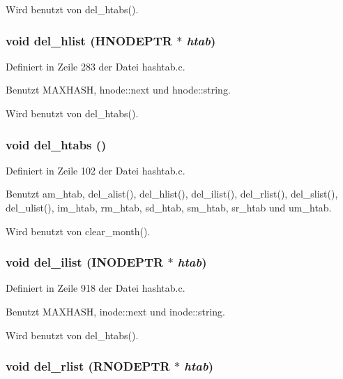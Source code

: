 Wird benutzt von del\_\-htabs().
\subsubsection{\setlength{\rightskip}{0pt plus 5cm}void del\_\-hlist ({\bf HNODEPTR} $\ast$ {\em htab})}\label{hashtab_8c_306d5a1540d43fa136c10272cb2f0a4a}




Definiert in Zeile 283 der Datei hashtab.c.

Benutzt MAXHASH, hnode::next und hnode::string.

Wird benutzt von del\_\-htabs().
\subsubsection{\setlength{\rightskip}{0pt plus 5cm}void del\_\-htabs ()}\label{hashtab_8c_f9fcdad76e91434fe5f0728f3a79ae74}




Definiert in Zeile 102 der Datei hashtab.c.

Benutzt am\_\-htab, del\_\-alist(), del\_\-hlist(), del\_\-ilist(), del\_\-rlist(), del\_\-slist(), del\_\-ulist(), im\_\-htab, rm\_\-htab, sd\_\-htab, sm\_\-htab, sr\_\-htab und um\_\-htab.

Wird benutzt von clear\_\-month().
\subsubsection{\setlength{\rightskip}{0pt plus 5cm}void del\_\-ilist ({\bf INODEPTR} $\ast$ {\em htab})}\label{hashtab_8c_d859897805bb7fc6479703fd3bcf493a}




Definiert in Zeile 918 der Datei hashtab.c.

Benutzt MAXHASH, inode::next und inode::string.

Wird benutzt von del\_\-htabs().
\subsubsection{\setlength{\rightskip}{0pt plus 5cm}void del\_\-rlist ({\bf RNODEPTR} $\ast$ {\em htab})}\label{hashtab_8c_99589c545676162533a82708505580c6}




